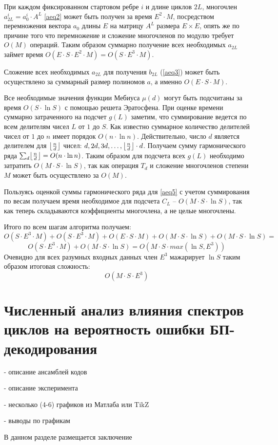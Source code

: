 \documentclass[specification,annotation,times]{itmo-student-thesis}
\DeclarePairedDelimiter\floor{\lfloor}{\rfloor}
\begin{document}
При каждом фиксированном стартовом ребре $i$ и длине циклов $2L$, многочлен $a_{2L}^i=a_0^i \cdot A^L$ \ref{aeq2}
может быть получен за время $E^2 \cdot M$, посредством перемножения вектора $a_0$ длины $E$ на матрицу
$A^L$ размера $E \times E$, опять же по причине того что перемножение и сложение многочленов по модулю 
требует $O(M)$ операций. Таким образом суммарно получение всех необходимых $a_{2L}$ займет
 время $O(E \cdot S \cdot E^2 \cdot M) = O(S \cdot E^3 \cdot M)$.

Сложение всех необходимых $a_{2L}$ для получения $b_{2L}$ (\ref{aeq3}) может быть осуществлено за суммарный размер 
полиномов $a$, а именно $O(E \cdot S \cdot M)$.

Все необходимые значения функции Мебиуса $\mu(d)$ могут быть подсчитаны за время $O(S \cdot \ln S)$ с
помощью решета Эратосфена. При оценке времени суммарно затраченного на подсчет $g(L)$ заметим,
 что суммирование ведется по всем делителям чисел $L$ от $1$ до $S$. Как известно суммарное количество
делителей чисел от $1$ до $n$ имеет порядок $O(n \cdot \ln n)$. Действительно, число $d$ является 
делителем для $\floor*{\frac{n}{d}}$ чисел: $d, 2d, 3d, \ldots, \floor*{\frac{n}{d}} \cdot d$. Получаем сумму гармонического ряда
 $\sum_d \floor*{\frac{n}{d}} = O(n \cdot \ln n)$. Таким образом для подсчета всех $g(L)$ необходимо затратить $O(M \cdot S \cdot \ln S)$,
так как операция $T_d$ и сложение многочленов степени $M$ может быть осуществлено за $O(M)$.

Пользуясь оценкой суммы гармонического ряда для \ref{aeq5} с учетом суммирования по весам получаем
время необходимое для подсчета $C_L$ -- $O(M \cdot S \cdot \ln S)$, так как теперь складываются 
коэффициенты многочлена, а не целые многочлены.

Итого по всем шагам алгоритма получаем:
\[
O(S \cdot E^3 \cdot M) + O(S \cdot E^3 \cdot M) + 
O(E \cdot S \cdot M) + O(M \cdot S \cdot \ln S) + O(M \cdot S \cdot \ln S)= 
\]
\[
O(S \cdot E^3 \cdot M) + O(M \cdot S \cdot \ln S) = O(M \cdot S \cdot max(\ln S, E^3))
\]
Очевидно для всех разумных входных данных член $E^3$ мажарирует $\ln S$ таким образом итоговая сложность:
\[
  O(M \cdot S \cdot E^3)
\]
\chapter{Численный анализ влияния спектров циклов на вероятность ошибки 
БП-декодирования} 

- описание ансамблей кодов

- описание эксперимента

- несколько (4-6) графиков из Матлаба или  TikZ

- выводы по графикам



\startconclusionpage

В данном разделе размещается заключение

\printmainbibliography
\end{document}
